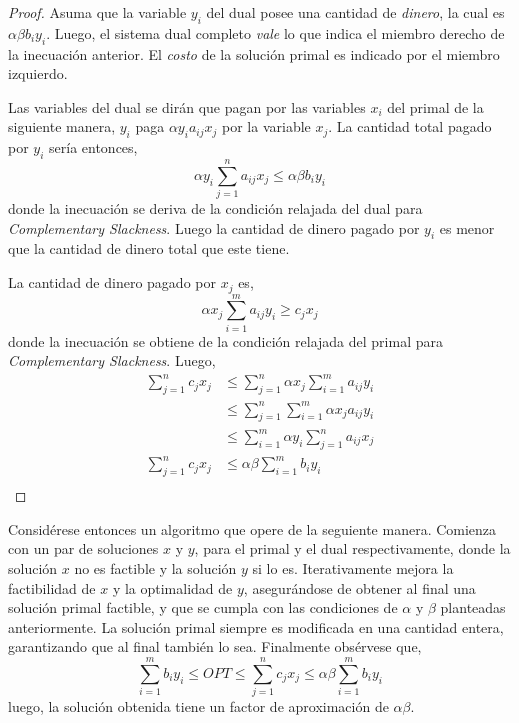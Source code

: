 \documentclass[../np-approximations.tex]{subfiles}
\begin{document}
\begin{proof}
	Asuma que la variable $y_i$ del dual posee una cantidad de \emph{dinero}, la cual es $\alpha \beta b_i y_i$. Luego, el sistema dual completo \emph{vale} lo que indica el miembro derecho de la inecuación anterior. El \emph{costo} de la solución primal es indicado por el miembro izquierdo.
						
	Las variables del dual se dirán que pagan por las variables $x_i$ del primal de la siguiente manera, $y_i$ paga $\alpha y_i a_{ij} x_j$ por la variable $x_j$. La cantidad total pagado por $y_i$ sería entonces,
	\begin{equation*}
		\alpha y_i\sum_{j=1}^n a_{ij}x_j \le \alpha\beta b_i y_i
	\end{equation*}
	donde la inecuación se deriva de la condición relajada del dual para \emph{Complementary Slackness}. Luego la cantidad de dinero pagado por $y_i$ es menor que la cantidad de dinero total que este tiene.
					
	La cantidad de dinero pagado por $x_j$ es,
	\begin{equation*}
		\alpha x_j \sum_{i=1}^m a_{ij}y_i \ge c_j x_j
	\end{equation*}
	donde la inecuación se obtiene de la condición relajada del primal para \emph{Complementary Slackness}. Luego,
	\begin{align*}
		\sum_{j=1}^n c_j x_j & \le \sum_{j=1}^n \alpha x_j \sum_{i=1}^m a_{ij} y_i \\
		                     & \le \sum_{j=1}^n \sum_{i=1}^m \alpha x_j a_{ij} y_i \\
		                     & \le \sum_{i=1}^m \alpha y_i \sum_{j=1}^n a_{ij} x_j \\
		\sum_{j=1}^n c_j x_j & \le \alpha \beta \sum_{i=1}^m b_i y_i               \\
	\end{align*}
						
\end{proof}

Considérese entonces un algoritmo que opere de la seguiente manera. Comienza con un par de soluciones $x$ y $y$, para el primal y el dual respectivamente, donde la solución $x$ no es factible y la solución $y$ si lo es. Iterativamente mejora la factibilidad de $x$ y la optimalidad de $y$, asegurándose de obtener al final una solución primal factible, y que se cumpla con las condiciones de $\alpha$ y $\beta$ planteadas anteriormente. La solución primal siempre es modificada en una cantidad entera, garantizando que al final también lo sea. Finalmente obsérvese que,
\begin{equation*}
	\sum_{i=1}^m b_i y_i \le OPT \le
	\sum_{j=1}^n c_j x_j \le \alpha \beta \sum_{i=1}^m b_i y_i
\end{equation*}
luego, la solución obtenida tiene un factor de aproximación de $\alpha \beta$.
\end{document}
